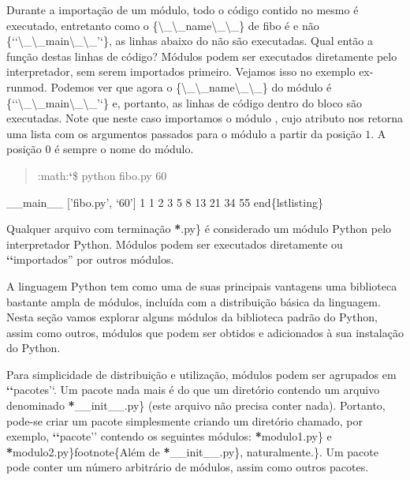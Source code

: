 \documentclass[a4paper,10pt,portuguese]{sphinxmanual}
\begin{document}
Durante a importação de um módulo, todo o código contido no mesmo é
executado, entretanto como o \{\textbackslash{}\_\textbackslash{}\_name\textbackslash{}\_\textbackslash{}\_\} de fibo é
 e não \{{}`{}`\textbackslash{}\_\textbackslash{}\_main\textbackslash{}\_\textbackslash{}\_'`\}, as linhas abaixo
do  não são executadas. Qual então a função destas linhas de
código? Módulos podem ser executados diretamente pelo
interpretador, sem serem importados primeiro. Vejamos isso no
exemplo ex-runmod. Podemos ver que agora o \{\textbackslash{}\_\textbackslash{}\_name\textbackslash{}\_\textbackslash{}\_\}
do módulo é \{{}`{}`\textbackslash{}\_\textbackslash{}\_main\textbackslash{}\_\textbackslash{}\_'`\} e, portanto, as linhas de
código dentro do bloco  são executadas. Note que neste caso
importamos o módulo , cujo atributo  nos retorna uma
lista com os argumentos passados para o módulo a partir da posição
$1$. A posição $0$ é sempre o nome do módulo.
\begin{quote}

:math:{\color{red}\bfseries{}{}`}\$ python fibo.py 60
\end{quote}

\_\_main\_\_
{[}'fibo.py', `60'{]}
1 1 2 3 5 8 13 21 34 55
end\{lstlisting\}

Qualquer arquivo com terminação  {\color{red}\bfseries{}*}.py\} é considerado um módulo Python pelo interpretador Python. Módulos podem ser executados diretamente ou {\color{red}\bfseries{}{}`{}`}importados'' por outros módulos.

A linguagem Python tem como uma de suas principais vantagens uma biblioteca bastante ampla de módulos, incluída com a distribuição básica da linguagem. Nesta seção vamos explorar alguns módulos da biblioteca padrão do Python, assim como outros, módulos que podem ser obtidos e adicionados à sua instalação do Python.

Para simplicidade de distribuição e utilização, módulos podem ser agrupados em {\color{red}\bfseries{}{}`{}`}pacotes'`. Um pacote nada mais é do que um diretório contendo um arquivo denominado {\color{red}\bfseries{}*}\_\_init\_\_.py\} (este arquivo não precisa conter nada). Portanto, pode-se criar um pacote simplesmente criando um diretório chamado, por exemplo, {\color{red}\bfseries{}{}`{}`}pacote'' contendo os seguintes módulos: {\color{red}\bfseries{}*}modulo1.py\} e {\color{red}\bfseries{}*}modulo2.py\}footnote\{Além de {\color{red}\bfseries{}*}\_\_init\_\_.py\}, naturalmente.\}. Um pacote pode conter um número arbitrário de módulos, assim como outros pacotes.
\end{document}
